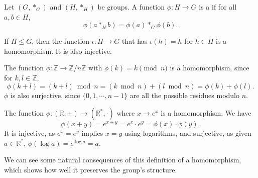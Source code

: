 \documentclass[a4paper]{scrartcl}
\begin{document}
\begin{definition}[Homomorphism]
	Let $(G, *_G)$ and $(H, *_H)$ be groups. A function $\phi : H \rightarrow G$ is a  if for all $a, b \in H$,
	$$
	\phi(a *_H b) = \phi(a) *_G \phi(b).
	$$
\end{definition}

\begin{example}
	If $H \leq G$, then the function $\iota : H \rightarrow G$ that has $\iota(h) = h$ for $h \in H$ is a homomorphism. It is also injective.
\end{example}

\begin{example}
	The function $\phi : \mathbb{Z}\rightarrow \mathbb{Z}/n\mathbb{Z}$ with $\phi(k) = k \pmod{n}$ is a homomorphism, since for $k, l \in \mathbb{Z}$,
	$$
\phi(k + l) = (k + l) \bmod{n} = (k \bmod{n}) + (l \bmod{n}) = \phi(k) + \phi(l).
	$$
	$\phi$ is also surjective, since $\{0, 1, \cdots, n - 1\}$ are all the possible residues modulo $n$.
\end{example}

\begin{example}
	The function $\phi : (\mathbb{R}, + )\rightarrow (\mathbb{R}^*, \cdot)$ where $x \rightarrow e^x$ is a homomorphism. We have
	$$
	\phi(x + y) = e^{x + y} = e^x \cdot e^y = \phi(x) \cdot \phi(y).
	$$
	It is injective, as $e^x = e^y$ implies $x = y$ using logarithms, and surjective, as given $a \in \mathbb{R}^*$, $\phi(\log a) = e^{\log a} = a$.
\end{example}

We can see some natural consequences of this definition of a homomorphism, which shows how well it preserves the group's structure.
\end{document}
